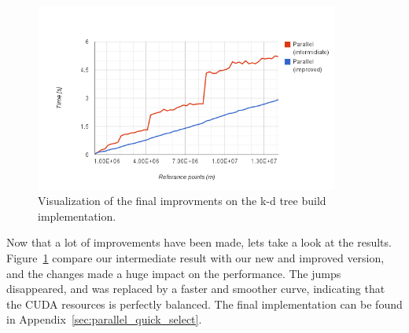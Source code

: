\begin{figure}[ht!]
\centering
\includegraphics[width=100mm]{../gfx/the_jumps_final.png}
\caption{Visualization of the final improvments on the k-d tree build implementation.}
\label{fig:the_jumps_final}
\end{figure}

Now that a lot of improvements have been made, lets take a look at the results. Figure~\ref{fig:the_jumps_final} compare our intermediate result with our new and improved version, and the changes made a huge impact on the performance. The jumps disappeared, and was replaced by a faster and smoother curve, indicating that the CUDA resources is perfectly balanced. The final implementation can be found in Appendix~\ref{sec:parallel_quick_select}.
